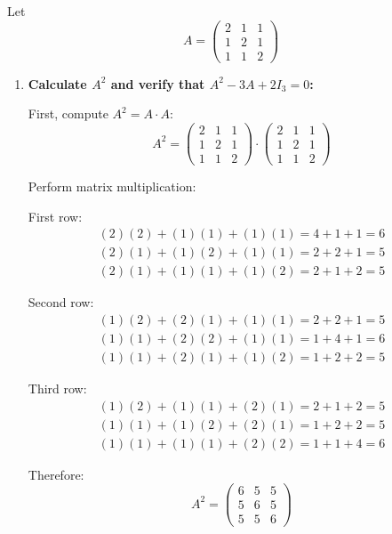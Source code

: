 \documentclass[12pt]{article}
\begin{document}
\begin{answerbox}
Let $$ A = \begin{pmatrix} 2 & 1 & 1 \\ 1 & 2 & 1 \\ 1 & 1 & 2 \end{pmatrix} $$

\begin{enumerate}
    \item \textbf{Calculate $ A^2 $ and verify that $ A^2 - 3A + 2I_3 = 0 $:}
    
    First, compute $ A^2 = A \cdot A $:
    $$
    A^2 = 
    \begin{pmatrix}
    2 & 1 & 1 \\
    1 & 2 & 1 \\
    1 & 1 & 2
    \end{pmatrix}
    \cdot
    \begin{pmatrix}
    2 & 1 & 1 \\
    1 & 2 & 1 \\
    1 & 1 & 2
    \end{pmatrix}
    $$

    Perform matrix multiplication:

    First row:
    $$
    \begin{align*}
    (2)(2) + (1)(1) + (1)(1) = 4 + 1 + 1 = 6 \\
    (2)(1) + (1)(2) + (1)(1) = 2 + 2 + 1 = 5 \\
    (2)(1) + (1)(1) + (1)(2) = 2 + 1 + 2 = 5
    \end{align*}
    $$

    Second row:
    $$
    \begin{align*}
    (1)(2) + (2)(1) + (1)(1) = 2 + 2 + 1 = 5 \\
    (1)(1) + (2)(2) + (1)(1) = 1 + 4 + 1 = 6 \\
    (1)(1) + (2)(1) + (1)(2) = 1 + 2 + 2 = 5
    \end{align*}
    $$

    Third row:
    $$
    \begin{align*}
    (1)(2) + (1)(1) + (2)(1) = 2 + 1 + 2 = 5 \\
    (1)(1) + (1)(2) + (2)(1) = 1 + 2 + 2 = 5 \\
    (1)(1) + (1)(1) + (2)(2) = 1 + 1 + 4 = 6
    \end{align*}
    $$

    Therefore:
    $$
    A^2 = \begin{pmatrix}
    6 & 5 & 5 \\
    5 & 6 & 5 \\
    5 & 5 & 6
    \end{pmatrix}
    $$


\end{enumerate}
\end{answerbox}
\end{document}
